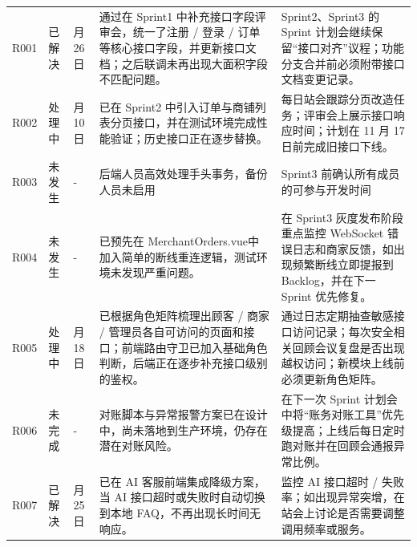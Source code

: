 \begin{longtable}{>{\centering\arraybackslash}m{1cm} >{\centering\arraybackslash}m{1.4cm} >{\centering\arraybackslash}m{1cm} >{\centering\arraybackslash}m{5cm} >{\centering\arraybackslash}m{4.5cm}}
    R001           & 已解决           & 10 月 26 日     & 通过在 Sprint1 中补充接口字段评审会，统一了注册 / 登录 / 订单等核心接口字段，并更新接口文档；之后联调未再出现大面积字段不匹配问题。                                   & Sprint2、Sprint3 的 Sprint 计划会继续保留“接口对齐”议程；功能分支合并前必须附带接口文档变更记录。                                \\
    R002           & 处理中           & 11 月 10 日     & 已在 Sprint2 中引入订单与商铺列表分页接口，并在测试环境完成性能验证；历史接口正在逐步替换。                                                          & 每日站会跟踪分页改造任务；评审会上展示接口响应时间；计划在 11 月 17 日前完成旧接口下线。                                             \\
    R003           & 未发生           & -             & 后端人员高效处理手头事务，备份人员未启用                                                                                        & Sprint3 前确认所有成员的可参与开发时间                                                                      \\
    R004           & 未发生           & -             & 已预先在 MerchantOrders.vue中加入简单的断线重连逻辑，测试环境未发现严重问题。                                                            & 在 Sprint3 灰度发布阶段重点监控 WebSocket 错误日志和商家反馈，如出现频繁断线立即提报到 Backlog，并在下一 Sprint 优先修复。              \\
    R005           & 处理中           & 11 月 18 日     & 已根据角色矩阵梳理出顾客 / 商家 / 管理员各自可访问的页面和接口；前端路由守卫已加入基础角色判断，后端正在逐步补充接口级别的鉴权。                                         & 通过日志定期抽查敏感接口访问记录；每次安全相关回顾会议复盘是否出现越权访问；新模块上线前必须更新角色矩阵。                                        \\
    R006           & 未完成           & -             & 对账脚本与异常报警方案已在设计中，尚未落地到生产环境，仍存在潜在对账风险。                                                                       & 在下一次 Sprint 计划会中将“账务对账工具”优先级提高；上线后每日定时跑对账并在回顾会通报异常比例。                                        \\
    R007           & 已解决           & 11 月 25 日     & 已在 AI 客服前端集成降级方案，当 AI 接口超时或失败时自动切换到本地 FAQ，不再出现长时间无响应。                                                       & 监控 AI 接口超时 / 失败率；如出现异常突增，在站会上讨论是否需要调整调用频率或服务。                                                \\

\end{longtable}
